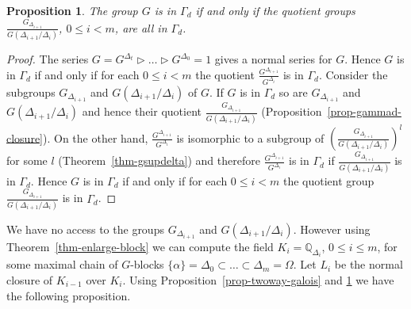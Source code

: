 \documentclass[11pt]{madras}%
\newtheorem{proposition}[theorem]{Proposition}
\theoremstyle{remark}
\newcommand{\Gof}[2][G]{{\ensuremath{#1\left(#2\right)}}}
\begin{document}
\begin{proposition}\label{prop-g-gdelta-gammad}
  The group $G$ is in $\Gamma_d$ if and only if the quotient groups
  $\frac{G_{\Delta_{i+1}}}{\Gof{\Delta_{i+1}/\Delta_i}}$, $0 \leq i <
  m$, are all in $\Gamma_d$.
\end{proposition}
\begin{proof}
  The series $G = G^{\Delta_t} \rhd \ldots \rhd G^{\Delta_0} = 1$
  gives a normal series for $G$.  Hence $G$ is in $\Gamma_d$ if and
  only if for each $0 \leq i < m$ the quotient
  $\frac{G^{\Delta_{i+1}}}{G^{\Delta_i}}$ is in $\Gamma_d$.  Consider
  the subgroups $G_{\Delta_{i+1}}$ and $\Gof{\Delta_{i+1}/\Delta_i}$
  of $G$.  If $G$ is in $\Gamma_d$ so are $G_{\Delta_{i+1}}$ and
  $\Gof{\Delta_{i+1}/\Delta_i}$ and hence their quotient
  $\frac{G_{\Delta_{i+1}}}{\Gof{\Delta_{i+1}/\Delta_i}}$
  (Proposition~\ref{prop-gammad-closure}). On the other hand,
  $\frac{G^{\Delta_{i+1}}}{G^{\Delta_i}}$ is isomorphic to a subgroup
  of
  $\left(\frac{G_{\Delta_{i+1}}}{\Gof{\Delta_{i+1}/\Delta_i}}\right)^l$
  for some $l$ (Theorem~\ref{thm-gsupdelta}) and therefore
  $\frac{G^{\Delta_{i+1}}}{G^{\Delta_i}}$ is in $\Gamma_d$ if
  $\frac{G_{\Delta_{i+1}}}{\Gof{\Delta_{i+1}/\Delta_i}}$ is in
  $\Gamma_d$.  Hence $G$ is in $\Gamma_d$ if and only if for each $0
  \leq i < m$ the quotient group
  $\frac{G_{\Delta_{i+1}}}{\Gof{\Delta_{i+1}/\Delta_i}}$ is in
  $\Gamma_d$.
\end{proof}


We have no access to the groups $G_{\Delta_{i+1}}$ and
$\Gof{\Delta_{i+1}/\Delta_i}$. However using
Theorem~\ref{thm-enlarge-block} we can compute the field $K_i =
\mathbb{Q}_{\Delta_i}$, $0 \leq i \leq m$, for some maximal chain of
$G$-blocks $\{ \alpha \} = \Delta_0 \subset \ldots \subset \Delta_m =
\Omega$.  Let $L_i$ be the normal closure of $K_{i-1}$ over $K_i$.
Using Proposition~\ref{prop-twoway-galois} and
\ref{prop-g-gdelta-gammad} we have the following proposition.
\end{document}
